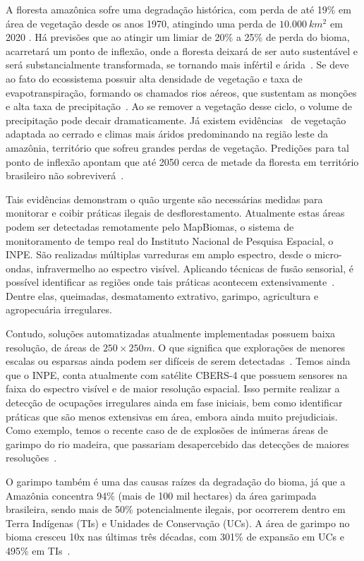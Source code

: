 A floresta amazônica sofre uma degradação histórica, com perda de até 19\% em área de vegetação desde os anos 1970, atingindo uma perda de \( 10.000~km^2 \) em 2020 \cite{ignacioNature}. Há previsões que ao atingir um limiar de 20\% a 25\% de perda do bioma, acarretará um ponto de inflexão, onde a floresta deixará de ser auto sustentável e será substancialmente transformada, se tornando mais infértil e árida~\cite{LovejoyTipping}. Se deve ao fato do ecossistema possuir alta densidade de vegetação e  taxa de evapotranspiração, formando os chamados rios aéreos, que sustentam as monções e alta taxa de precipitação~\cite{satyamurty2013moisture}. Ao se remover a vegetação desse ciclo, o volume de  precipitação pode decair dramaticamente. Já existem evidências~\cite{ignacioNature} de vegetação adaptada ao cerrado e climas mais áridos predominando na região leste da amazônia, território que sofreu grandes perdas de vegetação. Predições para tal ponto de inflexão apontam que até 2050 cerca de metade da floresta em território brasileiro não sobreviverá~\cite{LovejoyTipping}.

Tais evidências demonstram o quão urgente são necessárias medidas para monitorar e coibir práticas ilegais de desflorestamento. Atualmente estas áreas podem ser detectadas remotamente pelo MapBiomas, o sistema de monitoramento de tempo real do Instituto Nacional de Pesquisa Espacial, o INPE. São realizadas múltiplas varreduras em amplo espectro, desde o micro-ondas, infravermelho ao espectro visível. Aplicando técnicas de fusão sensorial, é possível identificar as regiões onde tais práticas acontecem extensivamente~\cite{inpe_deter}. Dentre elas, queimadas, desmatamento extrativo, garimpo, agricultura e agropecuária irregulares.

Contudo, soluções automatizadas atualmente implementadas possuem baixa resolução, de áreas de \(250\times250m\). O que significa que explorações de menores escalas ou esparsas ainda podem ser difíceis de serem detectadas~\cite{mapbiomasgarimpo}. Temos ainda que o INPE, conta atualmente com satélite CBERS-4 que possuem sensores na faixa do espectro visível e de maior resolução espacial. Isso permite realizar a detecção de ocupações irregulares ainda em fase iniciais, bem como identificar práticas que são menos extensivas em área, embora ainda muito prejudiciais. Como exemplo, temos o recente caso de de explosões de inúmeras áreas de garimpo do rio madeira, que passariam desapercebido das detecções de maiores resoluções~\cite{mapbiomasgarimpo}.


O garimpo também é uma das causas raízes da degradação do bioma, já que a Amazônia concentra 94\% (mais de 100 mil hectares) da área garimpada brasileira, sendo mais de 50\% potencialmente ilegais, por ocorrerem dentro em Terra Indígenas (TIs) e Unidades de Conservação (UCs). A área de garimpo no bioma cresceu 10x nas últimas três décadas, com 301\% de expansão em UCs e 495\% em TIs~\cite{mapbiomasgarimpo}.


